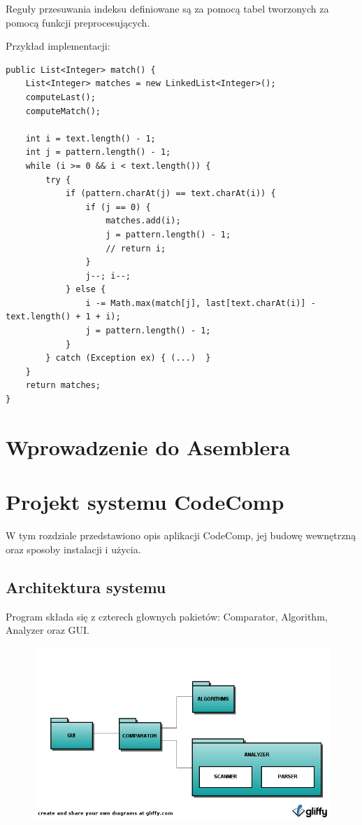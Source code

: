 \documentclass[a4paper,12pt]{article}
\begin{document}
Reguły przesuwania indeksu definiowane są za pomocą tabel tworzonych za pomocą funkcji preprocesujących.

Przykład implementacji:
\begin{lstlisting}
public List<Integer> match() {
	List<Integer> matches = new LinkedList<Integer>();
	computeLast();
	computeMatch();

	int i = text.length() - 1;
	int j = pattern.length() - 1;
	while (i >= 0 && i < text.length()) {
		try {
			if (pattern.charAt(j) == text.charAt(i)) {
				if (j == 0) {
					matches.add(i);
					j = pattern.length() - 1;
					// return i;
				}
				j--; i--;
			} else {
				i -= Math.max(match[j], last[text.charAt(i)] - text.length() + 1 + i);
				j = pattern.length() - 1;
			}
		} catch (Exception ex) { (...)  }
	}
	return matches;
}
\end{lstlisting}

\section{Wprowadzenie do Asemblera}

\section{Projekt systemu CodeComp}

W tym rozdziale przedstawiono opis aplikacji CodeComp, jej budowę wewnętrzną oraz sposoby instalacji i użycia.

\subsection{Architektura systemu}

Program składa się z czterech głownych pakietów: Comparator, Algorithm, Analyzer oraz GUI.

\begin{figure}[!h]
\centering
\includegraphics[scale=0.6]{gfx/packagediagram.png}
\end{figure}
\end{document}
